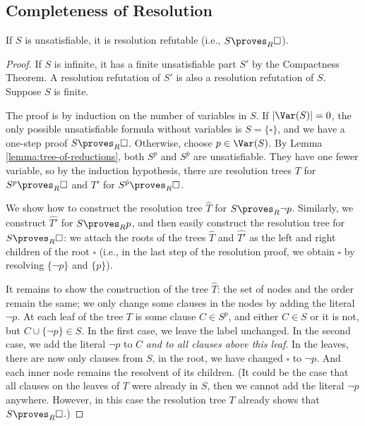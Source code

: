 \subsection{Completeness of Resolution}

\begin{theorem}
If $S$ is unsatisfiable, it is resolution refutable (i.e., $S \proves_R \square$).
\end{theorem}   
\begin{proof}
If $S$ is infinite, it has a finite unsatisfiable part $S'$ by the Compactness Theorem. A resolution refutation of $S'$ is also a resolution refutation of $S$. Suppose $S$ is finite.

The proof is by induction on the number of variables in $S$. If $|\Var(S)| = 0$, the only possible unsatisfiable formula without variables is $S = \{\square\}$, and we have a one-step proof $S \proves_R \square$. Otherwise, choose $p \in \Var(S)$. By Lemma \ref{lemma:tree-of-reductions}, both $S^p$ and $S^{\bar{p}}$ are unsatisfiable. They have one fewer variable, so by the induction hypothesis, there are resolution trees $T$ for $S^p \proves_R \square$ and $T'$ for $S^{\bar{p}} \proves_R \square$.

We show how to construct the resolution tree $\widehat{T}$ for $S \proves_R \neg p$. Similarly, we construct $\widehat{T'}$ for $S \proves_R p$, and then easily construct the resolution tree for $S \proves_R \square$: we attach the roots of the trees $\widehat{T}$ and $\widehat{T'}$ as the left and right children of the root $\square$ (i.e., in the last step of the resolution proof, we obtain $\square$ by resolving $\{\neg p\}$ and $\{p\}$).

It remains to show the construction of the tree $\widehat{T}$: the set of nodes and the order remain the same; we only change some clauses in the nodes by adding the literal $\neg p$. At each leaf of the tree $T$ is some clause $C \in S^p$, and either $C \in S$ or it is not, but $C \cup \{\neg p\} \in S$. In the first case, we leave the label unchanged. In the second case, we add the literal $\neg p$ to $C$ \emph{and to all clauses above this leaf}. In the leaves, there are now only clauses from $S$, in the root, we have changed $\square$ to $\neg p$. And each inner node remains the resolvent of its children. (It could be the case that all clauses on the leaves of $T$ were already in $S$, then we cannot add the literal $\neg p$ anywhere. However, in this case the resolution tree $T$ already shows that $S\proves_R \square$.)
\end{proof}

